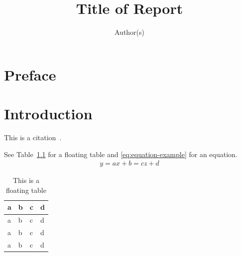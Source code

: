 \documentclass{tpk4170report}
\title{Title of Report}
\author{Author(s)}
\begin{document}
\maketitle

\frontmatter

\chapter*{Preface}

\tableofcontents
\listoffigures
\listoftables

\mainmatter








\chapter{Introduction}
\label{chap:Introduction}

\blindmathtrue
\blindtext

This is a citation~\cite{McCarthy2011}. \blindtext

See Table~\ref{table:floating-table} for a floating table and
\eqref{eq:equation-example} for an equation.
\begin{align}
  \label{eq:equation-example}
  y = ax + b 
    = cz + d 
\end{align}

\begin{table}
  \centering
  \begin{tabular}{l|lll}
    a& b& c &d \\
    \hline
    a& b& c &d \\
    a& b& c &d \\
    a& b& c &d
  \end{tabular}
  \caption{This is a floating table}
  \label{table:floating-table}
\end{table}
\end{document}
